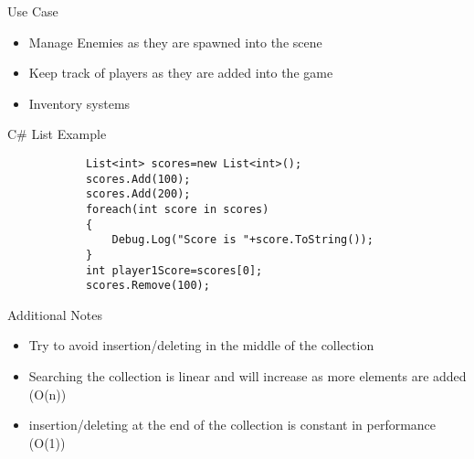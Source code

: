 \begin{frame}{Use Case}
	\begin{itemize}
		\pause \item Manage Enemies as they are spawned into the scene
		\pause \item Keep track of players as they are added into the game
		\pause \item Inventory systems 
	\end{itemize}
\end{frame}

\begin{frame}[fragile]{C\# List
	 Example}
			\begin{lstlisting}
			List<int> scores=new List<int>();
			scores.Add(100);
			scores.Add(200);
			foreach(int score in scores)
			{
				Debug.Log("Score is "+score.ToString());
			}
			int player1Score=scores[0];
			scores.Remove(100);
			\end{lstlisting}
\end{frame}

\begin{frame}{Additional Notes}
	\begin{itemize}
		\pause \item Try to avoid insertion/deleting in the middle of the collection
		\pause \item Searching the collection is linear and will increase as more elements are added (O(n))
		\pause \item insertion/deleting at the end of the collection is constant in performance (O(1)) 
	\end{itemize}
\end{frame}
